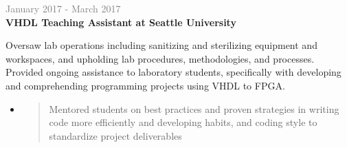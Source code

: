 \documentclass[letterpage]{article}
\begin{document}
\begin{minipage}[t]{0.61\linewidth}
\vspace{7px}
\textcolor{gray}{January 2017 - March 2017}
\quad 
\\
\textbf{\textsf{VHDL Teaching Assistant at Seattle University}}\\
\raggedright
Oversaw lab operations including sanitizing and sterilizing equipment and workspaces, and upholding lab procedures, methodologies, and processes. Provided ongoing assistance to laboratory students, specifically with developing and comprehending programming projects using VHDL to FPGA.
\\
\begin{itemize}[leftmargin=*,labelindent=1mm,labelsep=0mm]
\item
  \begin{quote}
  \raggedright
  Mentored students on best practices and proven strategies in writing code more efficiently and developing habits, and coding style to standardize project deliverables
  \end{quote}
\end{itemize}
\end{minipage}
\end{document}

